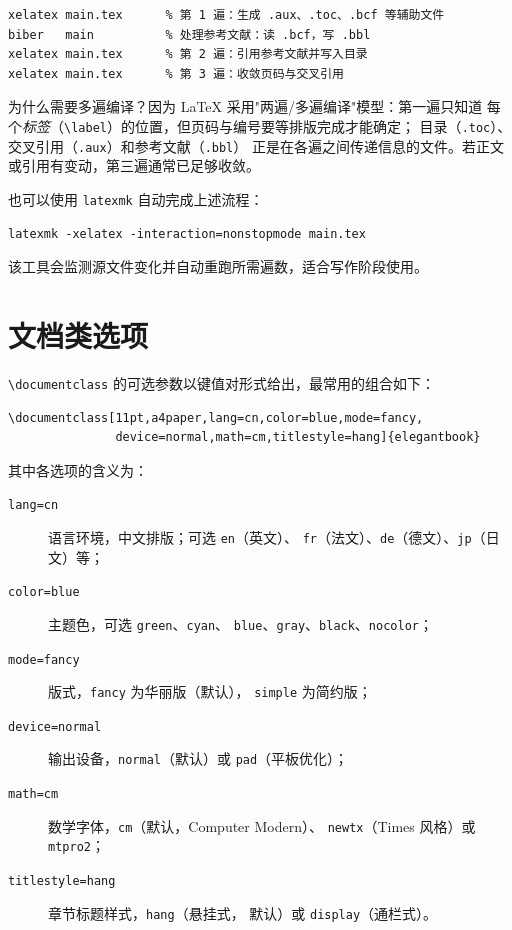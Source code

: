 \begin{verbatim}
xelatex main.tex      % 第 1 遍：生成 .aux、.toc、.bcf 等辅助文件
biber   main          % 处理参考文献：读 .bcf，写 .bbl
xelatex main.tex      % 第 2 遍：引用参考文献并写入目录
xelatex main.tex      % 第 3 遍：收敛页码与交叉引用
\end{verbatim}

为什么需要多遍编译？因为 LaTeX 采用"两遍/多遍编译"模型：第一遍只知道
每个\emph{标签}（\verb|\label|）的位置，但页码与编号要等排版完成才能确定；
目录（\texttt{.toc}）、交叉引用（\texttt{.aux}）和参考文献（\texttt{.bbl}）
正是在各遍之间传递信息的文件。若正文或引用有变动，第三遍通常已足够收敛。

\begin{remark}
也可以使用 \texttt{latexmk} 自动完成上述流程：
\begin{verbatim}
latexmk -xelatex -interaction=nonstopmode main.tex
\end{verbatim}
该工具会监测源文件变化并自动重跑所需遍数，适合写作阶段使用。
\end{remark}

\section{文档类选项}

\verb|\documentclass| 的可选参数以键值对形式给出，最常用的组合如下：

\begin{lstlisting}
\documentclass[11pt,a4paper,lang=cn,color=blue,mode=fancy,
               device=normal,math=cm,titlestyle=hang]{elegantbook}
\end{lstlisting}

其中各选项的含义为：

\begin{description}
  \item[\texttt{lang=cn}] 语言环境，中文排版；可选 \texttt{en}（英文）、
        \texttt{fr}（法文）、\texttt{de}（德文）、\texttt{jp}（日文）等；
  \item[\texttt{color=blue}] 主题色，可选 \texttt{green}、\texttt{cyan}、
        \texttt{blue}、\texttt{gray}、\texttt{black}、\texttt{nocolor}；
  \item[\texttt{mode=fancy}] 版式，\texttt{fancy} 为华丽版（默认），
        \texttt{simple} 为简约版；
  \item[\texttt{device=normal}] 输出设备，\texttt{normal}（默认）或
        \texttt{pad}（平板优化）；
  \item[\texttt{math=cm}] 数学字体，\texttt{cm}（默认，Computer Modern）、
        \texttt{newtx}（Times 风格）或 \texttt{mtpro2}；
  \item[\texttt{titlestyle=hang}] 章节标题样式，\texttt{hang}（悬挂式，
        默认）或 \texttt{display}（通栏式）。
\end{description}

